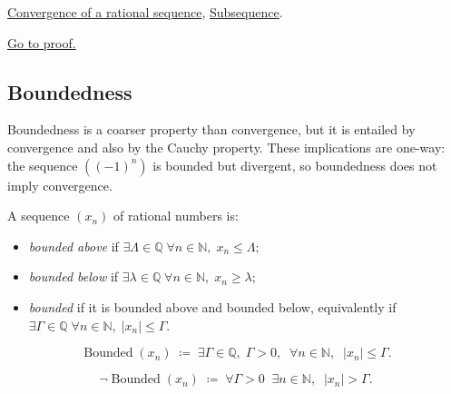 \begin{remark*}[Dependencies]
\hyperref[def:convergent-rational-sequence]{Convergence of a rational sequence},
\hyperref[def:subsequence-q]{Subsequence}.
\end{remark*}

\begin{remark*}[Proof]
\hyperref[prf:subsequence-convergence-q]{Go to proof.}
\end{remark*}

\subsection{Boundedness}
\label{subsec:boundedness-sequences-q}

\begin{remark}
Boundedness is a coarser property than convergence, but it is entailed by
convergence and also by the Cauchy property.  These implications are one-way:
the sequence $((-1)^n)$ is bounded but divergent, so boundedness does not
imply convergence.
\end{remark}

\begin{definition}
\label{def:bounded-sequence-q}
A sequence $(x_n)$ of rational numbers is:
\begin{itemize}
  \item \emph{bounded above} if $\exists \Lambda \in \mathbb{Q}\; \forall n \in \mathbb{N},\;
        x_n \leq \Lambda$;
  \item \emph{bounded below} if $\exists \lambda \in \mathbb{Q}\; \forall n \in \mathbb{N},\;
        x_n \geq \lambda$;
  \item \emph{bounded} if it is bounded above and bounded below, equivalently if
        $\exists \Gamma \in \mathbb{Q}\; \forall n \in \mathbb{N},\; |x_n| \leq \Gamma$.
\end{itemize}
\end{definition}

\begin{remark*}
\[
\operatorname{Bounded}(x_n)
\;\coloneqq\;
\exists \Gamma \in \mathbb{Q},\; \Gamma > 0,\;\;
\forall n \in \mathbb{N},\;\; |x_n| \leq \Gamma.
\]
\end{remark*}

\begin{remark*}
\[
\neg\operatorname{Bounded}(x_n)
\;\coloneqq\;
\forall \Gamma > 0 \;\; \exists n \in \mathbb{N},\;\; |x_n| > \Gamma.
\]
\end{remark*}

